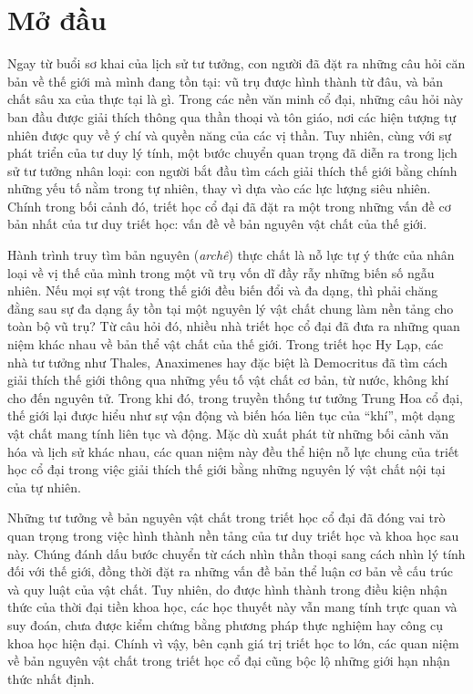 \documentclass[14pt,a4paper]{extarticle}
\begin{document}
\newpage
\tableofcontents
\newpage
\setcounter{page}{1}

\section*{Mở đầu}

Ngay từ buổi sơ khai của lịch sử tư tưởng, con người đã đặt ra những câu hỏi căn bản về thế giới mà mình đang tồn tại: vũ trụ được hình thành từ đâu, và bản chất sâu xa của thực tại là gì. Trong các nền văn minh cổ đại, những câu hỏi này ban đầu được giải thích thông qua thần thoại và tôn giáo, nơi các hiện tượng tự nhiên được quy về ý chí và quyền năng của các vị thần. Tuy nhiên, cùng với sự phát triển của tư duy lý tính, một bước chuyển quan trọng đã diễn ra trong lịch sử tư tưởng nhân loại: con người bắt đầu tìm cách giải thích thế giới bằng chính những yếu tố nằm trong tự nhiên, thay vì dựa vào các lực lượng siêu nhiên. Chính trong bối cảnh đó, triết học cổ đại đã đặt ra một trong những vấn đề cơ bản nhất của tư duy triết học: vấn đề về bản nguyên vật chất của thế giới.

Hành trình truy tìm bản nguyên (\emph{archê}) thực chất là nỗ lực tự ý thức của nhân loại về vị thế của mình trong một vũ trụ vốn dĩ đầy rẫy những biến số ngẫu nhiên. Nếu mọi sự vật trong thế giới đều biến đổi và đa dạng, thì phải chăng đằng sau sự đa dạng ấy tồn tại một nguyên lý vật chất chung làm nền tảng cho toàn bộ vũ trụ? Từ câu hỏi đó, nhiều nhà triết học cổ đại đã đưa ra những quan niệm khác nhau về bản thể vật chất của thế giới. Trong triết học Hy Lạp, các nhà tư tưởng như Thales, Anaximenes hay đặc biệt là Democritus đã tìm cách giải thích thế giới thông qua những yếu tố vật chất cơ bản, từ nước, không khí cho đến nguyên tử. Trong khi đó, trong truyền thống tư tưởng Trung Hoa cổ đại, thế giới lại được hiểu như sự vận động và biến hóa liên tục của ``khí'', một dạng vật chất mang tính liên tục và động. Mặc dù xuất phát từ những bối cảnh văn hóa và lịch sử khác nhau, các quan niệm này đều thể hiện nỗ lực chung của triết học cổ đại trong việc giải thích thế giới bằng những nguyên lý vật chất nội tại của tự nhiên.

Những tư tưởng về bản nguyên vật chất trong triết học cổ đại đã đóng vai trò quan trọng trong việc hình thành nền tảng của tư duy triết học và khoa học sau này. Chúng đánh dấu bước chuyển từ cách nhìn thần thoại sang cách nhìn lý tính đối với thế giới, đồng thời đặt ra những vấn đề bản thể luận cơ bản về cấu trúc và quy luật của vật chất. Tuy nhiên, do được hình thành trong điều kiện nhận thức của thời đại tiền khoa học, các học thuyết này vẫn mang tính trực quan và suy đoán, chưa được kiểm chứng bằng phương pháp thực nghiệm hay công cụ khoa học hiện đại. Chính vì vậy, bên cạnh giá trị triết học to lớn, các quan niệm về bản nguyên vật chất trong triết học cổ đại cũng bộc lộ những giới hạn nhận thức nhất định.
\end{document}
